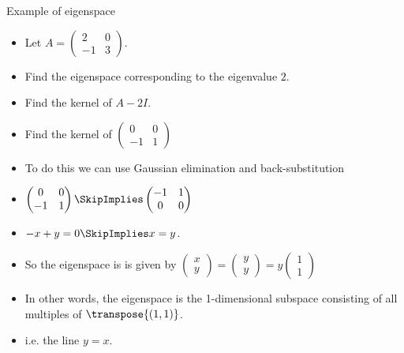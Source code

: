 \documentclass{beamer}
\begin{document}
\begin{frame}{Example of eigenspace}

\begin{itemize}
\item Let $A=
\begin{pmatrix}
2 & 0 \\
-1 & 3
\end{pmatrix}
$.
\item Find the eigenspace corresponding to the eigenvalue $2$.
\item Find the kernel of $A-2I$.
\item Find the kernel of
$
\begin{pmatrix}
0 & 0 \\
-1 & 1
\end{pmatrix}
$
\item To do this we can use Gaussian elimination and back-substitution
\item
$
\begin{pmatrix}
0 & 0 \\
-1 & 1
\end{pmatrix}
\SkipImplies
\begin{pmatrix}
-1 & 1 \\
0 & 0 \\
\end{pmatrix}
$
\item $-x + y = 0 \SkipImplies x = y$.
\item So the eigenspace is is given by
$
\begin{pmatrix}
x \\ y
\end{pmatrix}
=
\begin{pmatrix}
y \\ y
\end{pmatrix}
=
y
\begin{pmatrix}
1 \\ 1
\end{pmatrix}
$
\item In other words, the eigenspace is the 1-dimensional subspace consisting of
all multiples of $\transpose{(1,1)}$.
\item i.e. the line $y=x$.
\end{itemize}
\end{frame}
\end{document}
